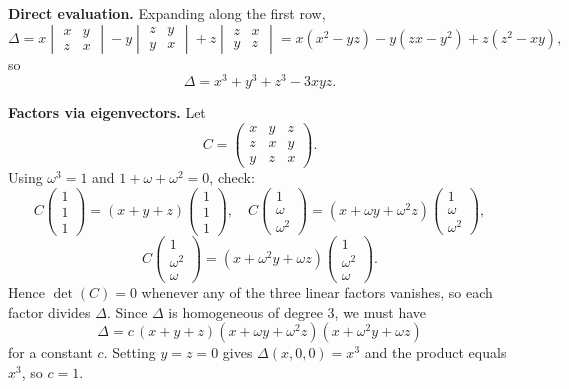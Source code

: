 \begin{solution}
\textbf{Direct evaluation.} Expanding along the first row,
\[
\Delta=
x\begin{vmatrix}x&y\\ z&x\end{vmatrix}
- y\begin{vmatrix}z&y\\ y&x\end{vmatrix}
+ z\begin{vmatrix}z&x\\ y&z\end{vmatrix}
=
x(x^2-yz)-y(zx-y^2)+z(z^2-xy),
\]
so
\[
\Delta=x^3+y^3+z^3-3xyz.
\]

\textbf{Factors via eigenvectors.}
Let
\[
C=\begin{pmatrix}
	x&y&z\\
	z&x&y\\
	y&z&x
\end{pmatrix}.
\]
Using \(\omega^3=1\) and \(1+\omega+\omega^2=0\), check:
\[
C\begin{pmatrix}1\\1\\1\end{pmatrix}=(x+y+z)\begin{pmatrix}1\\1\\1\end{pmatrix},\quad
C\begin{pmatrix}1\\\omega\\\omega^2\end{pmatrix}=(x+\omega y+\omega^2 z)\begin{pmatrix}1\\\omega\\\omega^2\end{pmatrix},
\]
\[
C\begin{pmatrix}1\\\omega^2\\\omega\end{pmatrix}=(x+\omega^2 y+\omega z)\begin{pmatrix}1\\\omega^2\\\omega\end{pmatrix}.
\]
Hence \(\det(C)=0\) whenever any of the three linear factors vanishes, so each factor divides \(\Delta\).
Since \(\Delta\) is homogeneous of degree \(3\), we must have
\[
\Delta=c\,(x+y+z)(x+\omega y+\omega^2 z)(x+\omega^2 y+\omega z)
\]
for a constant \(c\). Setting \(y=z=0\) gives \(\Delta(x,0,0)=x^3\) and the product equals \(x^3\), so \(c=1\).
\end{solution}

